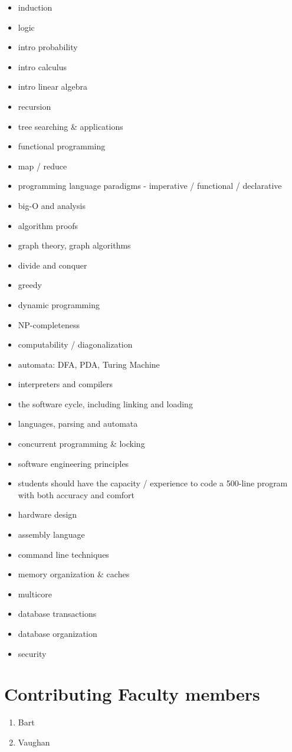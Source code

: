 \documentclass[draft]{article}
\begin{document}
\begin{itemize}
\item induction
\item logic
\item intro probability
\item intro calculus
\item intro linear algebra

\item recursion
\item tree searching \& applications
\item functional programming
\item map / reduce
\item programming language paradigms - imperative / functional / declarative

\item big-O and analysis
\item algorithm proofs
\item graph theory, graph algorithms
\item divide and conquer
\item greedy
\item dynamic programming
\item NP-completeness
\item computability / diagonalization
\item automata: DFA, PDA, Turing Machine

\item interpreters and compilers
\item the software cycle, including linking and loading
\item languages, parsing and automata
\item concurrent programming \& locking
\item software engineering principles
\item students should have the capacity / experience to code a 500-line program with both accuracy and comfort
\item hardware design
\item assembly language
\item command line techniques
\item memory organization \& caches
\item multicore
\item database transactions
\item database organization
\item security
\end{itemize}

\section{Contributing Faculty members}

\begin{enumerate}
\item Bart 
\item Vaughan
\end{enumerate}

  
\end{document}

